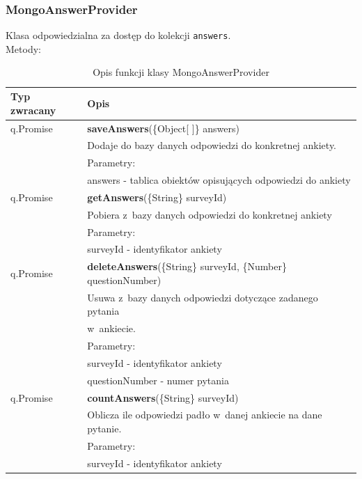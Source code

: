 \documentclass[12pt,a4paper,notitlepage]{article}
\begin{document}
\subsubsection{MongoAnswerProvider}
Klasa odpowiedzialna za dostęp do kolekcji \texttt{answers}. \\ 
Metody: 
\begin{center}
\begin{table}[H]
\caption{Opis funkcji klasy MongoAnswerProvider}
  \begin{tabular}{| l| l|}%
    \hline
    Typ zwracany & Opis \\ \hline \hline
  	q.Promise	&	\textbf{saveAnswers}(\{Object[ ]\} answers) \\
 &  Dodaje do bazy danych odpowiedzi do konkretnej ankiety. \\ 
 & Parametry: \\
 & answers - tablica obiektów opisujących odpowiedzi do ankiety \\ 
 \hline

q.Promise	&	\textbf{getAnswers}(\{String\} surveyId) \\
 &  Pobiera z~bazy danych odpowiedzi do konkretnej ankiety \\ 
 & Parametry: \\
 & surveyId - identyfikator ankiety \\ 
\hline
   
q.Promise	&	\textbf{deleteAnswers}(\{String\} surveyId, \{Number\} questionNumber) \\
 &  Usuwa z~bazy danych odpowiedzi dotyczące zadanego pytania \\ &  w~ankiecie.\\ 
 & Parametry: \\
 & surveyId - identyfikator ankiety \\ 
 & questionNumber - numer pytania \\
 \hline

q.Promise	&	\textbf{countAnswers}(\{String\} surveyId) \\
 &  Oblicza  ile odpowiedzi padło w~danej ankiecie na dane pytanie.\\ 
 & Parametry: \\
 & surveyId - identyfikator ankiety \\ 
 \hline
 
  \end{tabular}
\end{table}
\end{center}
\end{document}
